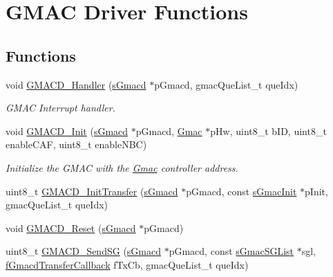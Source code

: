 \hypertarget{group__gmacd__functions}{}\section{G\+M\+AC Driver Functions}
\label{group__gmacd__functions}
\subsection*{Functions}
\begin{DoxyCompactItemize}
\item 
void \mbox{\hyperlink{group__gmacd__functions_ga782194c9b7163c22016beabc6101856c}{G\+M\+A\+C\+D\+\_\+\+Handler}} (\mbox{\hyperlink{group__gmacd__types_gaa8760917079000a5ee7fbc7fab992dd3}{s\+Gmacd}} $\ast$p\+Gmacd, gmac\+Que\+List\+\_\+t que\+Idx)
\begin{DoxyCompactList}\small\item\em G\+M\+AC Interrupt handler. \end{DoxyCompactList}\item 
void \mbox{\hyperlink{group__gmacd__functions_ga8706caf686e1d073851111db1ba2663c}{G\+M\+A\+C\+D\+\_\+\+Init}} (\mbox{\hyperlink{group__gmacd__types_gaa8760917079000a5ee7fbc7fab992dd3}{s\+Gmacd}} $\ast$p\+Gmacd, \mbox{\hyperlink{structGmac}{Gmac}} $\ast$p\+Hw, uint8\+\_\+t b\+ID, uint8\+\_\+t enable\+C\+AF, uint8\+\_\+t enable\+N\+BC)
\begin{DoxyCompactList}\small\item\em Initialize the G\+M\+AC with the \mbox{\hyperlink{structGmac}{Gmac}} controller address. \end{DoxyCompactList}\item 
uint8\+\_\+t \mbox{\hyperlink{group__gmacd__functions_ga418589cbbef19de6084670d572b6ae27}{G\+M\+A\+C\+D\+\_\+\+Init\+Transfer}} (\mbox{\hyperlink{group__gmacd__types_gaa8760917079000a5ee7fbc7fab992dd3}{s\+Gmacd}} $\ast$p\+Gmacd, const \mbox{\hyperlink{group__gmacd__types_ga5ab53aef1a598e4d862677f8f1928b20}{s\+Gmac\+Init}} $\ast$p\+Init, gmac\+Que\+List\+\_\+t que\+Idx)
\item 
void \mbox{\hyperlink{group__gmacd__functions_gaede5219eb9101a760ecb266722825318}{G\+M\+A\+C\+D\+\_\+\+Reset}} (\mbox{\hyperlink{group__gmacd__types_gaa8760917079000a5ee7fbc7fab992dd3}{s\+Gmacd}} $\ast$p\+Gmacd)
\item 
uint8\+\_\+t \mbox{\hyperlink{group__gmacd__functions_ga4dade176be1ff02c5dfb6371d873b5ed}{G\+M\+A\+C\+D\+\_\+\+Send\+SG}} (\mbox{\hyperlink{group__gmacd__types_gaa8760917079000a5ee7fbc7fab992dd3}{s\+Gmacd}} $\ast$p\+Gmacd, const \mbox{\hyperlink{group__gmacd__types_ga97ea4785757f8d33d38ed0563d84bfa4}{s\+Gmac\+S\+G\+List}} $\ast$sgl, \mbox{\hyperlink{group__gmacd__types_ga64979042bf43f697de166e864e3259de}{f\+Gmacd\+Transfer\+Callback}} f\+Tx\+Cb, gmac\+Que\+List\+\_\+t que\+Idx)

\end{DoxyCompactItemize}
